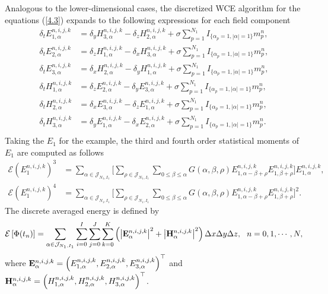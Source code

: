 \documentclass[preprint,12pt]{article}
\numberwithin{figure}{section}
\numberwithin{table}{section}
\numberwithin{equation}{section}
\begin{document}
Analogous to the lower-dimensional cases, the discretized WCE algorithm for the equations (\ref{4.3}) expands to the following expressions for each field component
\begin{equation*}
\begin{split}
\delta_{t}E_{1,\alpha}^{n,i,j,k}&=\delta_{y}H_{3,\alpha}^{n,i,j,k}-\delta_{z}H_{2,\alpha}^{n,i,j,k}+\sigma \sum_{p=1}^{N_1}I_{\{\alpha_{p}=1,|\alpha|=1\}}m_{p}^{n},\\
\delta_{t}E_{2,\alpha}^{n,i,j,k}&=\delta_{z}H_{1,\alpha}^{n,i,j,k}-\delta_{x}H_{3,\alpha}^{n,i,j,k}+\sigma \sum_{p=1}^{N_1}I_{\{\alpha_{p}=1,|\alpha|=1\}}m_{p}^{n},\\
\delta_{t}E_{3,\alpha}^{n,i,j,k}&=\delta_{x}H_{2,\alpha}^{n,i,j,k}-\delta_{y}H_{1,\alpha}^{n,i,j,k}+\sigma \sum_{p=1}^{N_1}I_{\{\alpha_{p}=1,|\alpha|=1\}}m_{p}^{n},\\
\delta_{t}H_{1,\alpha}^{n,i,j,k}&=\delta_{z}E_{2,\alpha}^{n,i,j,k}-\delta_{y}E_{3,\alpha}^{n,i,j,k}+\sigma \sum_{p=1}^{N_1}I_{\{\alpha_{p}=1,|\alpha|=1\}}m_{p}^{n},\\
\delta_{t}H_{2,\alpha}^{n,i,j,k}&=\delta_{x}E_{3,\alpha}^{n,i,j,k}-\delta_{z}E_{1,\alpha}^{n,i,j,k}+\sigma \sum_{p=1}^{N_1}I_{\{\alpha_{p}=1,|\alpha|=1\}}m_{p}^{n},\\
\delta_{t}H_{3,\alpha}^{n,i,j,k}&=\delta_{y}E_{1,\alpha}^{n,i,j,k}-\delta_{x}E_{2,\alpha}^{n,i,j,k}+\sigma \sum_{p=1}^{N_1}I_{\{\alpha_{p}=1,|\alpha|=1\}}m_{p}^{n}.\\
\end{split}
\end{equation*}
Taking the $E_1$ for the example, the third and fourth order statistical moments of $E_1$ are computed as follows
\begin{equation*}
\begin{split}
\mathcal{E}\left(E_1^{n,i,j,k}\right)^3&=\sum_{\alpha\in \mathcal{J}_{N_1,I_1}}\big[ \sum_{\rho\in \mathcal{J}_{N_1,I_1}}
\sum_{0\le \beta\le \alpha}G(\alpha,\beta,\rho)
 E^{n,i,j,k}_{1,\alpha-\beta+\rho}E^{n,i,j,k}_{1,\beta+\rho}\big]E^{n,i,j,k}_{1,\alpha},\\
\mathcal{E}\left(E_1^{n,i,j,k}\right)^4&=\sum_{\alpha\in \mathcal{J}_{N_1,I_1}}\big[\sum_{\rho\in \mathcal{J}_{N_1,I_1}}
\sum_{0\le \beta\le \alpha}G(\alpha,\beta,\rho)
 E^{n,i,j,k}_{1,\alpha-\beta+\rho}E^{n,i,j,k}_{1,\beta+\rho}\big]^2.
\end{split}
\end{equation*} 
The discrete averaged energy is defined by 
\begin{equation*}
\mathcal{E}\left[ \Phi(t_n)\right]=\sum_{\alpha\in \mathcal{J}_{N_1,I_1}}\sum_{i=0}^{I}\sum_{j=0}^{J}\sum_{k=0}^{K}\left(\left|{\bf E}_{\alpha}^{n,i,j,k}\right|^2+\left|{\bf H}_{\alpha}^{n,i,j,k}\right|^2  \right)\Delta x\Delta y\Delta z,~~n=0,1,\cdots,N,
\end{equation*}
where ${\bf E}_{\alpha}^{n,i,j,k}=\left( E_{1,\alpha}^{n,i,j,k},E_{2,\alpha}^{n,i,j,k},E_{3,\alpha}^{n,i,j,k}\right)^{\top}$ and ${\bf H}_{\alpha}^{n,i,j,k}=\left( H_{1,\alpha}^{n,i,j,k},H_{2,\alpha}^{n,i,j,k},H_{3,\alpha}^{n,i,j,k}\right)^{\top}$.
 
\end{document}
